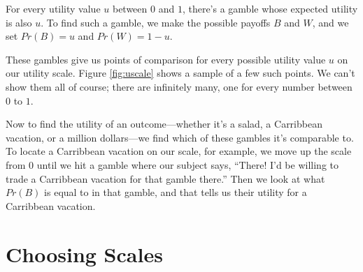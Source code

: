 \documentclass[justified]{tufte-book}
\newcommand{\p}{Pr}
\theoremstyle{definition}
\theoremstyle{definition}
\theoremstyle{definition}
\theoremstyle{definition}
\theoremstyle{remark}
\begin{document}
For every utility value \(u\) between \(0\) and \(1\), there's a gamble whose expected utility is also \(u\). To find such a gamble, we make the possible payoffs \(B\) and \(W\), and we set \(\p(B) = u\) and \(\p(W) = 1 - u\).

These gambles give us points of comparison for every possible utility value \(u\) on our utility scale. Figure \ref{fig:uscale} shows a sample of a few such points. We can't show them all of course; there are infinitely many, one for every number between \(0\) to \(1\).

Now to find the utility of an outcome---whether it's a salad, a Carribbean vacation, or a million dollars---we find which of these gambles it's comparable to. To locate a Carribbean vacation on our scale, for example, we move up the scale from \(0\) until we hit a gamble where our subject says, ``There! I'd be willing to trade a Carribbean vacation for that gamble there.'' Then we look at what \(\p(B)\) is equal to in that gamble, and that tells us their utility for a Carribbean vacation.

\hypertarget{choosing-scales}{%
\section{Choosing Scales}\label{choosing-scales}}
\end{document}
